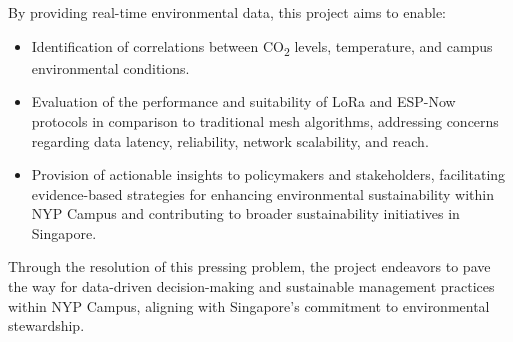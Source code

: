 By providing real-time environmental data, this project aims to enable:

\begin{itemize}
    \item Identification of correlations between CO\textsubscript{2} levels, temperature, and campus environmental conditions.
    \item Evaluation of the performance and suitability of LoRa and ESP-Now protocols in comparison to traditional mesh algorithms, addressing concerns regarding data latency, reliability, network scalability, and reach.
    \item Provision of actionable insights to policymakers and stakeholders, facilitating evidence-based strategies for enhancing environmental sustainability within NYP Campus and contributing to broader sustainability initiatives in Singapore.
\end{itemize}

Through the resolution of this pressing problem, the project endeavors to pave the way for data-driven decision-making and sustainable management practices within NYP Campus, aligning with Singapore's commitment to environmental stewardship.

